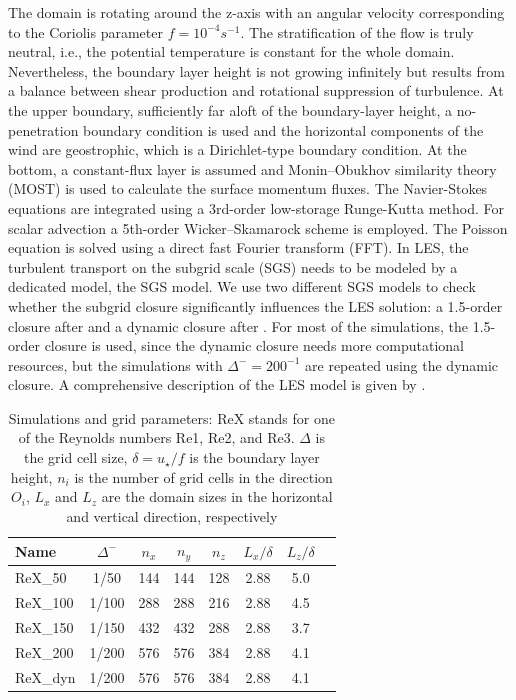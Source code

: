 \documentclass[a4paper,11pt]{article}
\begin{document}
The domain is rotating around the z-axis with an angular velocity corresponding to the Coriolis parameter $f=10^{-4}s^{-1}$. The stratification of the flow is truly neutral, i.e., the potential temperature is constant for the whole domain. Nevertheless, the boundary layer height is not growing infinitely but results from a balance between shear production and rotational suppression of turbulence. At the upper boundary, sufficiently far aloft of the boundary-layer height, a no-penetration boundary condition is used and the horizontal components of the wind are geostrophic, which is a Dirichlet-type boundary condition. At the bottom, a constant-flux layer is assumed and Monin--Obukhov similarity theory (MOST) is used to calculate the surface momentum fluxes. The Navier-Stokes equations are integrated using a 3rd-order low-storage Runge-Kutta method. For scalar advection a 5th-order Wicker--Skamarock scheme is employed. The Poisson equation is solved using a direct fast Fourier transform (FFT). In LES, the turbulent transport on the subgrid scale (SGS) needs to be modeled by a dedicated model, the SGS model. We use two different SGS models to check whether the subgrid closure significantly influences the LES solution: a 1.5-order closure after \cite{deardorff1980stratocumulus} and a dynamic closure after \cite{heinz2008realizability}. For most of the simulations, the 1.5-order closure is used, since the dynamic closure needs more computational resources, but the simulations with $\Delta^-=200^{-1}$ are repeated using the dynamic closure.  A comprehensive description of the LES model is given by \cite{maronga2020overview}.

\begin{table}
	\centering
	\caption{Simulations and grid parameters: ReX stands for one of the Reynolds numbers Re1, Re2, and Re3. $\Delta$ is the grid cell size, $\delta=u_\star/f$ is the boundary layer height, $n_i$ is the number of grid cells in the direction $O_i$, $L_x$ and $L_z$ are the domain sizes in the horizontal and vertical direction, respectively}
	  \begin{tabular}{lccccccc}
          \toprule 
	    Name & $\Delta^-$ & $n_x$ & $n_y$ & $n_z$ & $L_x/\delta$ & $L_z/\delta$  \\ 
          \midrule
  	  ReX\_50 & 1/50 & 144 & 144 & 128 & 2.88 & 5.0 \\
  	  ReX\_100 & 1/100 & 288 & 288 & 216 & 2.88 & 4.5 \\
	    ReX\_150 & 1/150 & 432 & 432 & 288 & 2.88 & 3.7 \\
  	  ReX\_200 & 1/200 & 576 & 576 & 384 & 2.88 & 4.1 \\
  	  ReX\_dyn & 1/200 & 576 & 576 & 384 & 2.88 & 4.1 \\
           \bottomrule
		\end{tabular}
	\label{simulation_parameters2}
\end{table}
\end{document}
